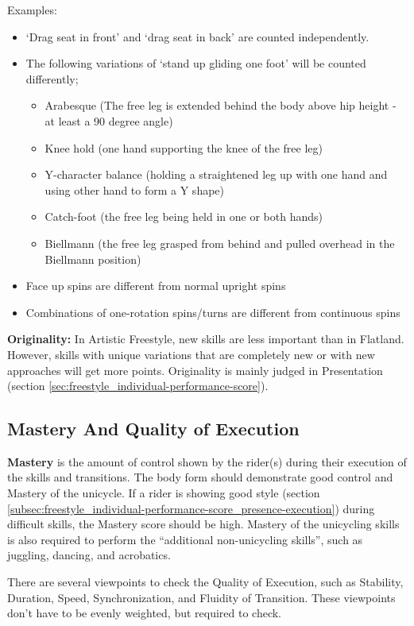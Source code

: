 Examples:
\begin{itemize}
\item `Drag seat in front' and `drag seat in back' are counted independently.
\item The following variations of `stand up gliding one foot' will be counted differently;
	\begin{itemize}
 	\item Arabesque (The free leg is extended behind the body above hip height - at least a 90 degree angle)
	\item Knee hold (one hand supporting the knee of the free leg)
	\item Y-character balance (holding a straightened leg up with one hand and using other hand to form a Y shape)
	\item Catch-foot (the free leg being held in one or both hands)
	\item Biellmann (the free leg grasped from behind and pulled overhead in the Biellmann position)
	\end{itemize}
\item Face up spins are different from normal upright spins
\item Combinations of one-rotation spins/turns are different from continuous spins
\end{itemize}

\textbf{Originality:} In Artistic Freestyle, new skills are less important than in Flatland.
However, skills with unique variations that are completely new or with new approaches will get more points.
Originality is mainly judged in Presentation (section \ref{sec:freestyle_individual-performance-score}).

\subsection{Mastery And Quality of Execution}
\textbf{Mastery} is the amount of control shown by the rider(s) during their execution of the skills and transitions.
The body form should demonstrate good control and Mastery of the unicycle.
If a rider is showing good style (section \ref{subsec:freestyle_individual-performance-score_presence-execution}) during difficult skills, the Mastery score should be high.
Mastery of the unicycling skills is also required to perform the ``additional non-unicycling skills'', such as juggling, dancing, and acrobatics.

There are several viewpoints to check the Quality of Execution, such as Stability, Duration, Speed, Synchronization, and Fluidity of Transition.
These viewpoints don't have to be evenly weighted, but required to check.

